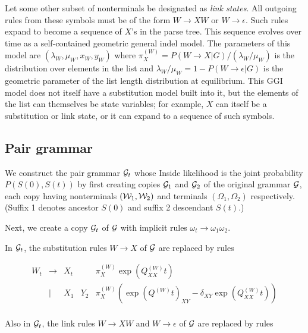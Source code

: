 \documentclass{article}
\begin{document}
Let some other subset of nonterminals be designated as {\em link states}.
All outgoing rules from these symbols must be of the form $W \to X W$ or $W \to \epsilon$.
Such rules expand to become a sequence of $X$'s in the parse tree.
This sequence evolves over time as a self-contained geometric general indel model.
The parameters of this model are $(\lambda_W, \mu_W, x_W, y_W)$
where $\pi^{(W)}_X = P(W \to X|G) / (\lambda_W / \mu_W)$ is the distribution over elements in the list
and $\lambda_W / \mu_W = 1 - P(W \to \epsilon|G)$ is the geometric parameter of the list length distribution at equilibrium.
This GGI model does not itself have a substitution model built into it,
but the elements of the list can themselves be state variables;
for example, $X$ can itself be a substitution or link state,
or it can expand to a sequence of such symbols.

\subsection{Pair grammar}

We construct the pair grammar ${\cal G}_t$ whose Inside likelihood is the joint probability $P(S(0),S(t))$
by first creating copies ${\cal G}_1$ and ${\cal G}_2$ of the original grammar ${\cal G}$,
each copy having nonterminals $({\cal W}_1,{\cal W}_2)$ and terminals $(\Omega_1,\Omega_2)$ respectively.
(Suffix 1 denotes ancestor $S(0)$ and suffix 2 descendant $S(t)$.)

Next, we create a copy ${\cal G}_t$ of ${\cal G}$ with implicit rules $\omega_t \to \omega_1 \omega_2$.

In ${\cal G}_t$, the substitution rules $W \to X$ of ${\cal G}$ are replaced by rules

\[
\begin{array}{rclll}
  W_t & \to & X_t & & \pi^{(W)}_X \exp(Q^{(W)}_{XX} t) \\
      & | & X_1 & Y_2 & \pi^{(W)}_X (\exp(Q^{(W)} t)_{XY} - \delta_{XY} \exp(Q^{(W)}_{XX} t)) \\
\end{array}
\]

Also in ${\cal G}_t$, the link rules $W \to X W$ and $W\to\epsilon$ of ${\cal G}$ are replaced by rules
\end{document}
